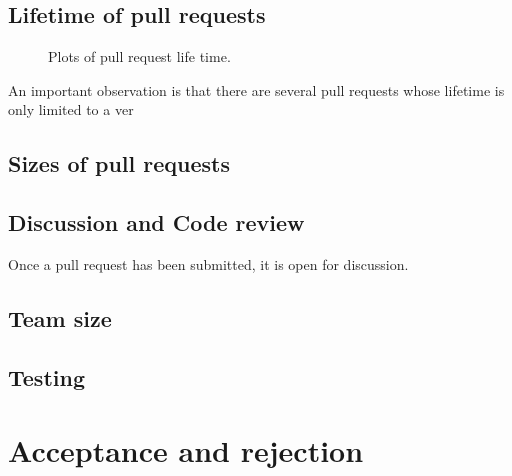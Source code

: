 \documentclass{sig-alternate}
\begin{document}
\subsection{Lifetime of pull requests}



\begin{figure*}
\centering
{}
\caption{Plots of pull request life time.}
\end{figure*}


An important observation is that there are several pull requests whose
lifetime is only limited to a ver

\subsection{Sizes of pull requests}



\subsection{Discussion and Code review}

Once a pull request has been submitted, it is open for discussion.

\subsection{Team size}

\subsection{Testing}

\section{Acceptance and rejection}
\label{sec:accrej}
\end{document}
